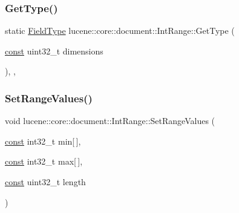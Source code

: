 \subsubsection{\texorpdfstring{Get\+Type()}{GetType()}}
{\footnotesize\ttfamily static \mbox{\hyperlink{classlucene_1_1core_1_1document_1_1FieldType}{Field\+Type}} lucene\+::core\+::document\+::\+Int\+Range\+::\+Get\+Type (\begin{DoxyParamCaption}\item[{\mbox{\hyperlink{ZlibCrc32_8h_a2c212835823e3c54a8ab6d95c652660e}{const}} uint32\+\_\+t}]{dimensions }\end{DoxyParamCaption})\hspace{0.3cm}{\ttfamily [inline]}, {\ttfamily [static]}, {\ttfamily [private]}}

\mbox{\label{classlucene_1_1core_1_1document_1_1IntRange_a0516e1b5b62b2e0c6b3104be7dd3abaa}} 
\subsubsection{\texorpdfstring{Set\+Range\+Values()}{SetRangeValues()}}
{\footnotesize\ttfamily void lucene\+::core\+::document\+::\+Int\+Range\+::\+Set\+Range\+Values (\begin{DoxyParamCaption}\item[{\mbox{\hyperlink{ZlibCrc32_8h_a2c212835823e3c54a8ab6d95c652660e}{const}} int32\+\_\+t}]{min\mbox{[}$\,$\mbox{]},  }\item[{\mbox{\hyperlink{ZlibCrc32_8h_a2c212835823e3c54a8ab6d95c652660e}{const}} int32\+\_\+t}]{max\mbox{[}$\,$\mbox{]},  }\item[{\mbox{\hyperlink{ZlibCrc32_8h_a2c212835823e3c54a8ab6d95c652660e}{const}} uint32\+\_\+t}]{length }\end{DoxyParamCaption})\hspace{0.3cm}{\ttfamily [inline]}}

\mbox{\label{classlucene_1_1core_1_1document_1_1IntRange_a536d7453de3ac80b6aeba4597e1b65c1}} 
